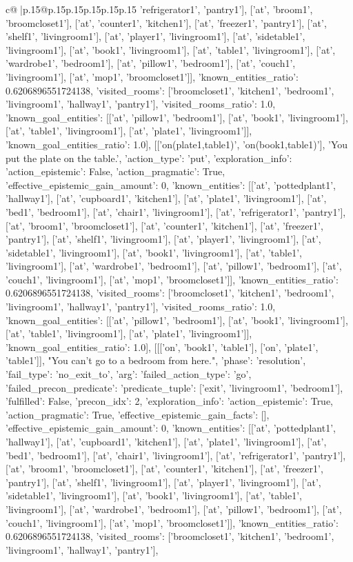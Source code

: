 \documentclass{article}
\begin{document}
{\begin{supertabular}{c@{$\;$}|p{.15\linewidth}@{}p{.15\linewidth}p{.15\linewidth}p{.15\linewidth}p{.15\linewidth}p{.15\linewidth}}
{{{'refrigerator1', 'pantry1'], ['at', 'broom1', 'broomcloset1'], ['at', 'counter1', 'kitchen1'], ['at', 'freezer1', 'pantry1'], ['at', 'shelf1', 'livingroom1'], ['at', 'player1', 'livingroom1'], ['at', 'sidetable1', 'livingroom1'], ['at', 'book1', 'livingroom1'], ['at', 'table1', 'livingroom1'], ['at', 'wardrobe1', 'bedroom1'], ['at', 'pillow1', 'bedroom1'], ['at', 'couch1', 'livingroom1'], ['at', 'mop1', 'broomcloset1']], 'known_entities_ratio': 0.6206896551724138, 'visited_rooms': ['broomcloset1', 'kitchen1', 'bedroom1', 'livingroom1', 'hallway1', 'pantry1'], 'visited_rooms_ratio': 1.0, 'known_goal_entities': [['at', 'pillow1', 'bedroom1'], ['at', 'book1', 'livingroom1'], ['at', 'table1', 'livingroom1'], ['at', 'plate1', 'livingroom1']], 'known_goal_entities_ratio': 1.0}}], [['on(plate1,table1)', 'on(book1,table1)'], 'You put the plate on the table.', {'action_type': 'put', 'exploration_info': {'action_epistemic': False, 'action_pragmatic': True, 'effective_epistemic_gain_amount': 0, 'known_entities': [['at', 'pottedplant1', 'hallway1'], ['at', 'cupboard1', 'kitchen1'], ['at', 'plate1', 'livingroom1'], ['at', 'bed1', 'bedroom1'], ['at', 'chair1', 'livingroom1'], ['at', 'refrigerator1', 'pantry1'], ['at', 'broom1', 'broomcloset1'], ['at', 'counter1', 'kitchen1'], ['at', 'freezer1', 'pantry1'], ['at', 'shelf1', 'livingroom1'], ['at', 'player1', 'livingroom1'], ['at', 'sidetable1', 'livingroom1'], ['at', 'book1', 'livingroom1'], ['at', 'table1', 'livingroom1'], ['at', 'wardrobe1', 'bedroom1'], ['at', 'pillow1', 'bedroom1'], ['at', 'couch1', 'livingroom1'], ['at', 'mop1', 'broomcloset1']], 'known_entities_ratio': 0.6206896551724138, 'visited_rooms': ['broomcloset1', 'kitchen1', 'bedroom1', 'livingroom1', 'hallway1', 'pantry1'], 'visited_rooms_ratio': 1.0, 'known_goal_entities': [['at', 'pillow1', 'bedroom1'], ['at', 'book1', 'livingroom1'], ['at', 'table1', 'livingroom1'], ['at', 'plate1', 'livingroom1']], 'known_goal_entities_ratio': 1.0}}], [[['on', 'book1', 'table1'], ['on', 'plate1', 'table1']], "You can't go to a bedroom from here.", {'phase': 'resolution', 'fail_type': 'no_exit_to', 'arg': {'failed_action_type': 'go', 'failed_precon_predicate': {'predicate_tuple': ['exit', 'livingroom1', 'bedroom1'], 'fulfilled': False, 'precon_idx': 2}}, 'exploration_info': {'action_epistemic': True, 'action_pragmatic': True, 'effective_epistemic_gain_facts': [], 'effective_epistemic_gain_amount': 0, 'known_entities': [['at', 'pottedplant1', 'hallway1'], ['at', 'cupboard1', 'kitchen1'], ['at', 'plate1', 'livingroom1'], ['at', 'bed1', 'bedroom1'], ['at', 'chair1', 'livingroom1'], ['at', 'refrigerator1', 'pantry1'], ['at', 'broom1', 'broomcloset1'], ['at', 'counter1', 'kitchen1'], ['at', 'freezer1', 'pantry1'], ['at', 'shelf1', 'livingroom1'], ['at', 'player1', 'livingroom1'], ['at', 'sidetable1', 'livingroom1'], ['at', 'book1', 'livingroom1'], ['at', 'table1', 'livingroom1'], ['at', 'wardrobe1', 'bedroom1'], ['at', 'pillow1', 'bedroom1'], ['at', 'couch1', 'livingroom1'], ['at', 'mop1', 'broomcloset1']], 'known_entities_ratio': 0.6206896551724138, 'visited_rooms': ['broomcloset1', 'kitchen1', 'bedroom1', 'livingroom1', 'hallway1', 'pantry1'], }}}
\end{supertabular}}
\end{document}
